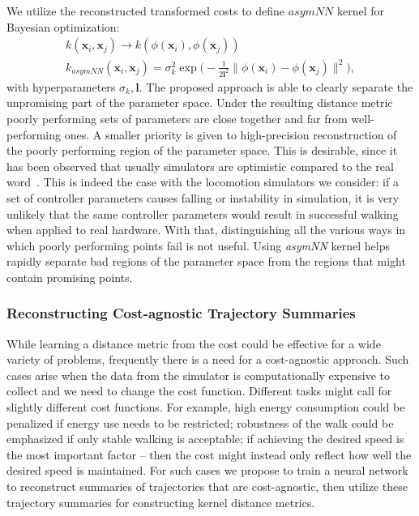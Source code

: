 We utilize the reconstructed transformed costs to define $\textit{asymNN}$ kernel for Bayesian optimization:
\begin{align}
    k(\pmb{x}_i, \pmb{x}_j) \rightarrow k(\phi(\pmb{x}_i), \phi(\pmb{x}_j)) \\
    k_{asymNN}(\pmb{x}_i, \pmb{x}_j) = \sigma_k^2 \exp\Big(- \frac{1}{2 \pmb{l}^2} \|\phi(\pmb{x}_i) - \phi(\pmb{x}_j)\|^2 \Big),
\end{align}
with hyperparameters $\sigma_k, \pmb{l}$.
The proposed approach is able to clearly separate the unpromising part of the parameter space. Under the resulting distance metric poorly performing sets of parameters are close together and far from well-performing ones. 
A smaller priority is given to high-precision reconstruction of the poorly performing region of the parameter space. This is desirable, since it has been observed that usually simulators are optimistic compared to the real word~\citep{cutler2015real}. This is indeed the case with the locomotion simulators we consider: if a set of controller parameters causes falling or instability in simulation, it is very unlikely that the same controller parameters would result in successful walking when applied to real hardware. With that, distinguishing all the various ways in which poorly performing points fail is not useful. Using \textit{asymNN} kernel helps rapidly separate bad regions of the parameter space from the regions that might contain promising points. 

\subsubsection{Reconstructing Cost-agnostic Trajectory Summaries}
\label{sec:approach_traj}

While learning a distance metric from the cost could be effective for a wide variety of problems, frequently there is a need for a cost-agnostic approach. Such cases arise when the data from the simulator is computationally expensive to collect and we need to change the cost function. Different tasks might call for slightly different cost functions. For example, high energy consumption could be penalized if energy use needs to be restricted; robustness of the walk could be emphasized if only stable walking is acceptable; if achieving the desired speed is the most important factor -- then the cost might instead only reflect how well the desired speed is maintained. For such cases we propose to train a neural network to reconstruct summaries of trajectories that are cost-agnostic, then utilize these trajectory summaries for constructing kernel distance metrics.

